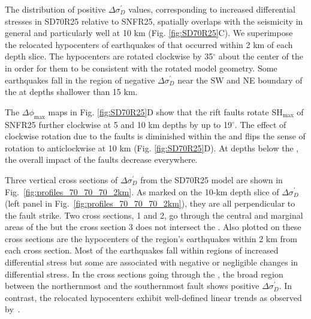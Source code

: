 \documentclass[draft]{agujournal2018}
\begin{document}
The distribution of positive $\Delta\sigma_{D}^{\prime}$ values, corresponding to increased differential stresses in SD70R25 relative to SNFR25, spatially overlaps with the seismicity in general and particularly well at 10 km (Fig. \ref{fig:SD70R25}C).  We superimpose the relocated hypocenters of earthquakes of \citet{Powell_2017} that occurred within 2 km of each depth slice. The hypocenters are rotated clockwise by 35$^{\circ}$ about the center of the  in order for them to be consistent with the rotated model geometry. Some earthquakes fall in the region of negative $\Delta\sigma_{D}^{\prime}$ near the SW and NE boundary of the  at depths shallower than 15 km.

The $\Delta\phi_{\max}$ maps in Fig. \ref{fig:SD70R25}D show that the rift faults rotate SH$_{\max}$ of SNFR25 further clockwise at 5 and 10 km depths by up to 19$^{\circ}$. The effect of clockwise rotation due to the faults is diminished within the  and flips the sense of rotation to anticlockwise at 10 km (Fig. \ref{fig:SD70R25}D). At depths below the , the overall impact of the faults decrease everywhere.

Three vertical cross sections of $\Delta\sigma_{D}^{\prime}$ from the SD70R25 model are shown in Fig.~\ref{fig:profiles_70_70_70_2km}. As marked on the 10-km depth slice of $\Delta\sigma_{D}^{\prime}$ (left panel in Fig.~\ref{fig:profiles_70_70_70_2km}), they are all perpendicular to the fault strike. Two cross sections, 1 and 2, go through the central and marginal areas of the  but the cross section 3 does not intersect the . Also plotted on these cross sections are the hypocenters of the region's earthquakes within 2 km from each cross section. Most of the earthquakes fall within regions of increased differential stress but some are associated with negative or negligible changes in differential stress. In the cross sections going through the , the broad region between the northernmost and the southernmost fault shows positive $\Delta\sigma_{D}^{\prime}$. In contrast, the relocated hypocenters exhibit well-defined linear trends as observed by~\citet{Powell_2017}.
\end{document}
